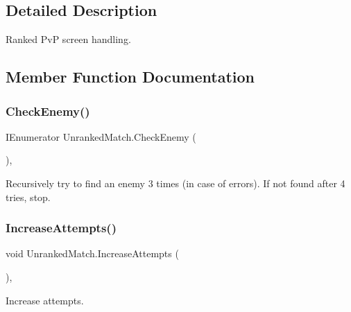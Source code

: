 \subsection{Detailed Description}
Ranked PvP screen handling. 

\subsection{Member Function Documentation}
\mbox{\label{class_unranked_match_ae723d97807f1686b46648b2bbee881ee}} 
\subsubsection{\texorpdfstring{CheckEnemy()}{CheckEnemy()}}
{\footnotesize\ttfamily I\+Enumerator Unranked\+Match.\+Check\+Enemy (\begin{DoxyParamCaption}{ }\end{DoxyParamCaption})\hspace{0.3cm}{\ttfamily [inline]}, {\ttfamily [private]}}



Recursively try to find an enemy 3 times (in case of errors). If not found after 4 tries, stop. 

\mbox{\label{class_unranked_match_a155dc55d0125b9fa9fe2625d976e6278}} 
\subsubsection{\texorpdfstring{IncreaseAttempts()}{IncreaseAttempts()}}
{\footnotesize\ttfamily void Unranked\+Match.\+Increase\+Attempts (\begin{DoxyParamCaption}{ }\end{DoxyParamCaption})\hspace{0.3cm}{\ttfamily [inline]}, {\ttfamily [private]}}



Increase attempts. 

\mbox{\label{class_unranked_match_afce2d9b096ad7e07913e6e574055083e}} 
